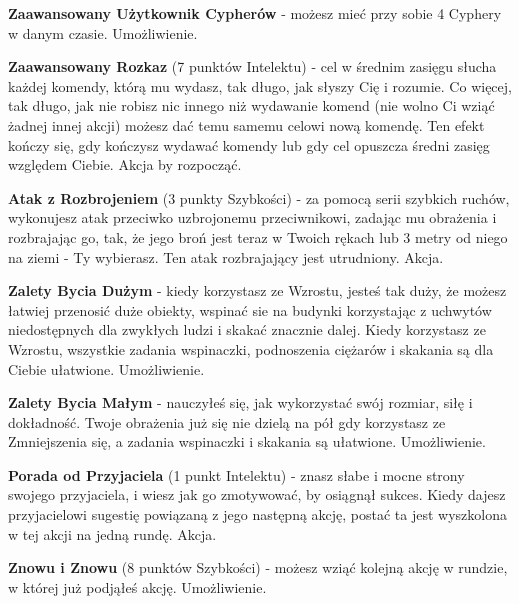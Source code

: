 \textbf{Zaawansowany Użytkownik Cypherów}\label{sec:Zaawansowany Użytkownik Cypherów} - możesz mieć przy sobie 4 Cyphery w danym czasie. Umożliwienie. 

\textbf{Zaawansowany Rozkaz}\label{sec:Zaawansowany Rozkaz} (7 punktów Intelektu) - cel w średnim zasięgu słucha każdej komendy, którą mu wydasz, tak długo, jak słyszy Cię i rozumie. Co więcej, tak długo, jak nie robisz nic innego niż wydawanie komend (nie wolno Ci wziąć żadnej innej akcji) możesz dać temu samemu celowi nową komendę. Ten efekt kończy się, gdy kończysz wydawać komendy lub gdy cel opuszcza średni zasięg względem Ciebie. Akcja by rozpocząć. 

\textbf{Atak z Rozbrojeniem}\label{sec:Atak z Rozbrojeniem} (3 punkty Szybkości) - za pomocą serii szybkich ruchów, wykonujesz atak przeciwko uzbrojonemu przeciwnikowi, zadając mu obrażenia i rozbrajając go, tak, że jego broń jest teraz w Twoich rękach lub 3 metry od niego na ziemi - Ty wybierasz. Ten atak rozbrajający jest utrudniony. Akcja.

\textbf{Zalety Bycia Dużym}\label{sec:Zalety Bycia Dużym} - kiedy korzystasz ze Wzrostu, jesteś tak duży, że możesz łatwiej przenosić duże obiekty, wspinać sie na budynki korzystając z uchwytów niedostępnych dla zwykłych ludzi i skakać znacznie dalej. Kiedy korzystasz ze Wzrostu, wszystkie zadania wspinaczki, podnoszenia ciężarów i skakania są dla Ciebie ułatwione. Umożliwienie.

\textbf{Zalety Bycia Małym}\label{sec:Zalety Bycia Małym} - nauczyłeś się, jak wykorzystać swój rozmiar, siłę i dokładność. Twoje obrażenia już się nie dzielą na pół gdy korzystasz ze Zmniejszenia się, a zadania wspinaczki i skakania są ułatwione. Umożliwienie.

\textbf{Porada od Przyjaciela}\label{sec:Porada od Przyjaciela} (1 punkt Intelektu) - znasz słabe i mocne strony swojego przyjaciela, i wiesz jak go zmotywować, by osiągnął sukces. Kiedy dajesz przyjacielowi sugestię powiązaną z jego następną akcję, postać ta jest wyszkolona w tej akcji na jedną rundę. Akcja. 

\textbf{Znowu i Znowu}\label{sec:Znowu i Znowu} (8 punktów Szybkości) - możesz wziąć kolejną akcję w rundzie, w której już podjąłeś akcję. Umożliwienie.

